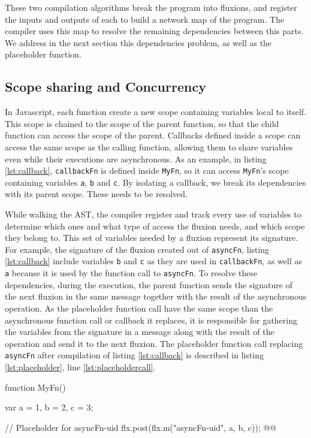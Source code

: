 These two compilation algorithms break the program into fluxions, and register the inputs and outputs of each to build a network map of the program.
The compiler uses this map to resolve the remaining dependencies between this parts.
We address in the next section this dependencies problem, as well as the placeholder function.

\subsection{Scope sharing and Concurrency} \label{ss:Scope}

In Javascript, each function create a new scope containing variables local to itself.
This scope is chained to the scope of the parent function, so that the child function can access the scope of the parent.
Callbacks defined inside a scope can access the same scope as the calling function, allowing them to share variables even while their executions are asynchronous.
As an example, in listing \ref{lst:callback}, \texttt{callbackFn} is defined inside \texttt{MyFn}, so it can access \texttt{MyFn}'s scope containing variables \texttt{a}, \texttt{b} and \texttt{c}.
By isolating a callback, we break its dependencies with its parent scope. These needs to be resolved.

While walking the AST, the compiler register and track every use of variables to determine which ones and what type of access the fluxion needs, and which scope they belong to.
This set of variables needed by a fluxion represent its signature.
For example, the signature of the fluxion created out of \texttt{asyncFn}, listing \ref{lst:callback} include variables \texttt{b} and \texttt{c} as they are used in \texttt{callbackFn}, as well as \texttt{a} because it is used by the function call to \texttt{asyncFn}.
To resolve these dependencies, during the execution, the parent function sends the signature of the next fluxion in the same message together with the result of the asynchronous operation.
As the placeholder function call have the same scope than the asynchronous function call or callback it replaces, it is responsible for gathering the variables from the signature in a message along with the result of the operation and send it to the next fluxion.
The placeholder function call replacing \texttt{asyncFn} after compilation of listing \ref{lst:callback} is described in listing \ref{lst:placeholder}, line \ref{lst:placeholdercall}.

\begin{code}[Javascript, caption={Example of a placeholder function call},label={lst:placeholder}]
function MyFn() {
  var a = 1,
      b = 2,
      c = 3;

  // Placeholder for asyncFn-uid
  flx.post(flx.m("asyncFn-uid", {a, b, c})); @\label{lst:placeholdercall}@
}
\end{code}



